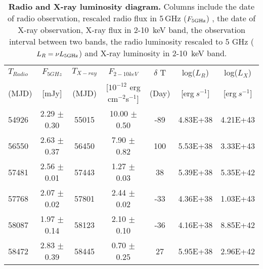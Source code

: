 \begin{table}
\centering
\caption{{\bf Radio and X-ray luminosity diagram.} Columns include the date of radio observation, rescaled radio flux in 5$\,$GHz ($F_{\rm{5GHz}}$)  , the date of X-ray observation,  X-ray flux in 2-10~keV band, the observation interval between two bands, the radio luminosity rescaled to 5 GHz ($L_R=\nu L_{\rm{5GHz}}$) and X-ray luminosity in 2-10~keV band.}
\label{tab:radio_xray}
\begin{tabular}{lcccccc}
\hline
\hline

$T_{Radio}$ & $F_{5GHz}$  & $T_{X-ray}$  & $F_{2-10keV}$ & $\delta$ T & log($L_{R}$) &log($L_{X}$) \\ 
(MJD) & [mJy]& (MJD) &[$10^{-12}$ erg cm$^{-2}$\rm{s}$^{-1}$]   &(Day)   & [erg$~s^{-1}$] &[erg$~s^{-1}$] \\
\hline


    54926 & 2.29  $\pm$ 0.30  & 55015 & 10.00 $\pm$ 0.50  & -89   & 4.83E+38 & 4.21E+43 \\
    56550 & 2.63  $\pm$ 0.37  & 56450 & 7.90  $\pm$ 0.82  & 100   & 5.53E+38 & 3.33E+43 \\
    57481 & 2.56  $\pm$ 0.01  & 57443 & 1.27  $\pm$ 0.03  & 38    & 5.39E+38 & 5.35E+42 \\
    57768 & 2.07  $\pm$ 0.02  & 57801 & 2.44  $\pm$ 0.02  & -33   & 4.36E+38 & 1.03E+43 \\
    58087 & 1.97  $\pm$ 0.14  & 58123 & 2.10  $\pm$ 0.10  & -36   & 4.16E+38 & 8.85E+42 \\
    58472 & 2.83  $\pm$ 0.39  & 58445 & 0.70  $\pm$ 0.25  & 27    & 5.95E+38 & 2.96E+42 \\


 \hline
\end{tabular}\\
\end{table}
